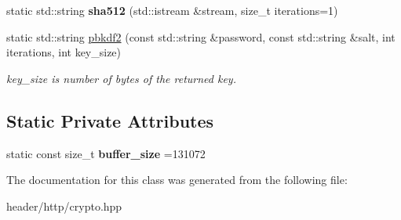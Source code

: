 \begin{DoxyCompactItemize}
\item 
\mbox{\label{class_simple_web_1_1_crypto_a95b77524631a18e1fd1e2584e062d452}} 
static std\+::string {\bfseries sha512} (std\+::istream \&stream, size\+\_\+t iterations=1)
\item 
\mbox{\label{class_simple_web_1_1_crypto_a53d0a191ebda80d31c291260343e38fe}} 
static std\+::string \hyperlink{class_simple_web_1_1_crypto_a53d0a191ebda80d31c291260343e38fe}{pbkdf2} (const std\+::string \&password, const std\+::string \&salt, int iterations, int key\+\_\+size)
\begin{DoxyCompactList}\small\item\em key\+\_\+size is number of bytes of the returned key. \end{DoxyCompactList}\end{DoxyCompactItemize}
\subsection*{Static Private Attributes}
\begin{DoxyCompactItemize}
\item 
\mbox{\label{class_simple_web_1_1_crypto_a535775900225f463e7ed14f984695865}} 
static const size\+\_\+t {\bfseries buffer\+\_\+size} =131072
\end{DoxyCompactItemize}


The documentation for this class was generated from the following file\+:\begin{DoxyCompactItemize}
\item 
header/http/crypto.\+hpp\end{DoxyCompactItemize}
